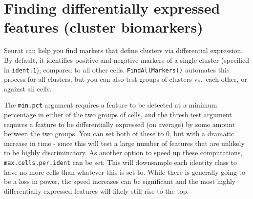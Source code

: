 \documentclass[
]{book}
\begin{document}
\hypertarget{finding-differentially-expressed-features-cluster-biomarkers}{%
\section{Finding differentially expressed features (cluster biomarkers)}\label{finding-differentially-expressed-features-cluster-biomarkers}}

Seurat can help you find markers that define clusters via differential expression. By default, it identifies positive and negative markers of a single cluster (specified in \texttt{ident.1}), compared to all other cells. \texttt{FindAllMarkers()} automates this process for all clusters, but you can also test groups of clusters vs.~each other, or against all cells.

The \texttt{min.pct} argument requires a feature to be detected at a minimum percentage in either of the two groups of cells, and the thresh.test argument requires a feature to be differentially expressed (on average) by some amount between the two groups. You can set both of these to 0, but with a dramatic increase in time - since this will test a large number of features that are unlikely to be highly discriminatory. As another option to speed up these computations, \texttt{max.cells.per.ident} can be set. This will downsample each identity class to have no more cells than whatever this is set to. While there is generally going to be a loss in power, the speed increases can be significant and the most highly differentially expressed features will likely still rise to the top.
\end{document}
